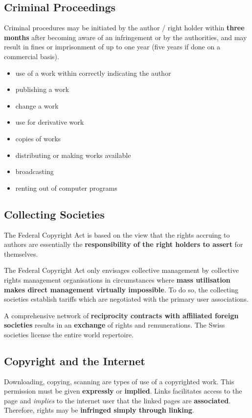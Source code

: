 \documentclass[11pt]{article}
\theoremstyle{definition}
\begin{document}
\subsection{Criminal Proceedings}

Criminal procedures may be initiated by the author / right holder within \textbf{three months} after becoming aware of an infringement or by the authorities, and may result in fines or imprisonment of up to one year (five years if done on a commercial basis).

\begin{itemize}
	\item use of a work within correctly indicating the author
	\item publishing a work
	\item change a work
	\item use for derivative work
	\item copies of works
	\item distributing or making works available
	\item broadcasting
	\item renting out of computer programs
\end{itemize}

\subsection{Collecting Societies}
The Federal Copyright Act is based on the view that the rights accruing to authors are essentially the \textbf{responsibility of the right holders to assert} for themselves.

The Federal Copyright Act only envisages collective management by collective rights management organisations in circumstances where \textbf{mass utilisation makes direct management virtually impossible}. To do so, the collecting societies establish tariffs which are negotiated with the primary user associations.

A comprehensive network of \textbf{reciprocity contracts with affiliated foreign societies} results in an \textbf{exchange} of rights and remunerations. The Swiss societies license the entire world repertoire.

\subsection{Copyright and the Internet}
Downloading, copying, scanning are types of use of a copyrighted work. This permission must be given \textbf{expressly} or \textbf{implied}. Links facilitates access to the page and \emph{implies} to the internet user that the linked pages are \textbf{associated}. Therefore, rights may be \textbf{infringed simply through linking}.
\end{document}
